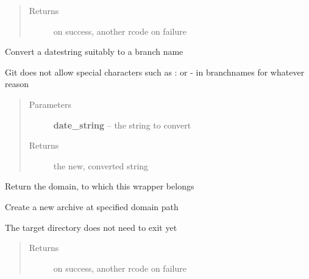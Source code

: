 \documentclass[letterpaper,10pt,english]{sphinxmanual}
\begin{document}
\begin{fulllineitems}
\begin{fulllineitems}
\begin{quote}
\begin{description}
\item[{Returns}]  on success, another rcode on failure

\end{description}\end{quote}

\end{fulllineitems}


\begin{fulllineitems}
\label{git:crawler.git.Git.convert_branch_name}
Convert a datestring suitably to a branch name

Git does not allow special characters such as : or -
in branchnames for whatever reason
\begin{quote}\begin{description}
\item[{Parameters}] \leavevmode
\textbf{date\_string} -- the string to convert

\item[{Returns}] \leavevmode
the new, converted string

\end{description}\end{quote}

\end{fulllineitems}


\begin{fulllineitems}
\label{git:crawler.git.Git.domain}
Return the domain, to which this wrapper belongs

\end{fulllineitems}


\begin{fulllineitems}
\label{git:crawler.git.Git.init}
Create a new archive at specified domain path

The target directory does not need to exit yet
\begin{quote}\begin{description}
\item[{Returns}]  on success, another rcode on failure


\end{description}
\end{quote}
\end{fulllineitems}
\end{fulllineitems}
\end{document}
